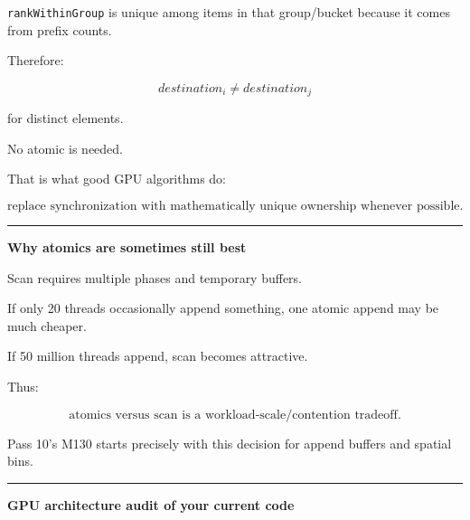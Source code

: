 \texttt{rankWithinGroup} is unique among items in that group/bucket because it comes from prefix counts.

Therefore:

\[
destination_i
\neq
destination_j
\]

for distinct elements.

No atomic is needed.

That is what good GPU algorithms do:

\[
\boxed{
\text{replace synchronization with mathematically unique ownership whenever possible}.
}
\]

\begin{center}\rule{0.5\linewidth}{0.5pt}\end{center}

\textbf{Why atomics are sometimes still best}

Scan requires multiple phases and temporary buffers.

If only 20 threads occasionally append something, one atomic append may be much cheaper.

If 50 million threads append, scan becomes attractive.

Thus:

\[
\boxed{
\text{atomics versus scan is a workload-scale/contention tradeoff}.
}
\]

Pass 10's M130 starts precisely with this decision for append buffers and spatial bins.

\begin{center}\rule{0.5\linewidth}{0.5pt}\end{center}

\textbf{GPU architecture audit of your current code}

